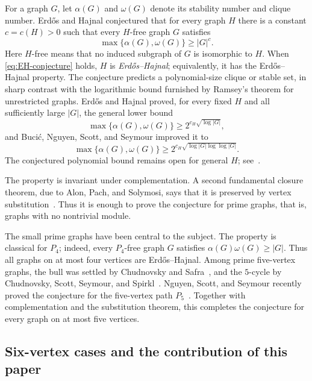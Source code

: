 \documentclass[11pt]{article}
\numberwithin{equation}{section}
\theoremstyle{plain}
\theoremstyle{definition}
\begin{document}
For a graph $G$, let $\alpha(G)$ and $\omega(G)$ denote its stability
number and clique number.  Erd\H{o}s and Hajnal conjectured that for every
graph $H$ there is a constant $c=c(H)>0$ such that every $H$-free graph
$G$ satisfies
\begin{equation}
             \max\{\alpha(G),\omega(G)\}\geq |G|^c.
             \label{eq:EH-conjecture}
\end{equation}
Here $H$-free means that no induced subgraph of $G$ is isomorphic to
$H$.  When \eqref{eq:EH-conjecture} holds, $H$ is
\emph{Erd\H{o}s--Hajnal}; equivalently, it has the Erd\H{o}s--Hajnal
property.  The conjecture predicts a
polynomial-size clique or stable set, in sharp contrast with the
logarithmic bound furnished
by Ramsey's theorem for unrestricted graphs.  Erd\H{o}s and Hajnal
proved, for every fixed $H$ and all sufficiently large $|G|$, the
general lower bound
\[
 \max\{\alpha(G),\omega(G)\}
      \geq 2^{c_H\sqrt{\log |G|}},
\]
and Buci\'c, Nguyen, Scott, and Seymour improved it to
\[
 \max\{\alpha(G),\omega(G)\}
      \geq
      2^{c_H\sqrt{\log |G|\log\log |G|}}.
\]
The conjectured polynomial bound remains open for general $H$;
see~\cite{BucicNguyenScottSeymour2024,ErdosHajnal1989}.

The property is invariant under complementation.  A second fundamental
closure theorem, due to Alon, Pach, and Solymosi, says that it is
preserved by vertex substitution~\cite{AlonPachSolymosi2001}.  Thus it
is enough to prove the conjecture for prime graphs, that is, graphs with
no nontrivial module.

The small prime graphs have been central to the subject.  The property
is classical for $P_4$; indeed, every $P_4$-free graph $G$ satisfies
$\alpha(G)\omega(G)\geq |G|$.  Thus all graphs on at most four vertices
are Erd\H{o}s--Hajnal.  Among prime five-vertex graphs, the bull was
settled by Chudnovsky and Safra~\cite{ChudnovskySafra2008}, and the
$5$-cycle by Chudnovsky, Scott, Seymour, and
Spirkl~\cite{ChudnovskyScottSeymourSpirkl2023}.  Nguyen, Scott, and
Seymour recently proved the conjecture for the five-vertex path
$P_5$~\cite{NguyenScottSeymourP5}.  Together with complementation and
the substitution theorem, this completes the conjecture for every graph
on at most five vertices.

\subsection{Six-vertex cases and the contribution of this paper}
\end{document}
